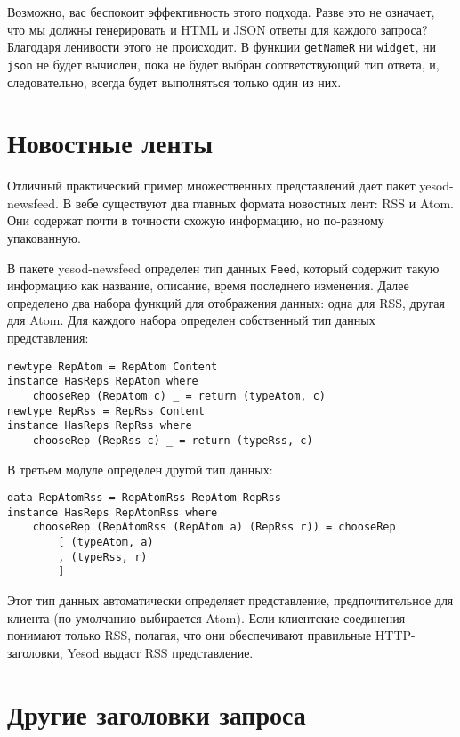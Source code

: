 Возможно, вас беспокоит эффективность этого подхода. Разве это не означает, что мы должны
генерировать и HTML и JSON ответы для каждого запроса? Благодаря ленивости этого не
происходит. В функции \lstinline'getNameR' ни \lstinline'widget', ни \lstinline'json' не
будет вычислен, пока не будет выбран соответствующий тип ответа, и, следовательно, всегда
будет выполняться только один из них.

\section{Новостные ленты}

Отличный практический пример множественных представлений дает пакет yesod-newsfeed. В вебе существуют два главных формата новостных лент: RSS и Atom. Они содержат почти в точности схожую информацию, но по-разному упакованную.

В пакете yesod-newsfeed определен тип данных \lstinline'Feed', который содержит такую информацию как название, описание, время последнего изменения. Далее определено два набора функций для отображения данных: одна для RSS, другая для Atom. Для каждого набора определен собственный тип данных представления:

\begin{lstlisting}
newtype RepAtom = RepAtom Content
instance HasReps RepAtom where
    chooseRep (RepAtom c) _ = return (typeAtom, c)
newtype RepRss = RepRss Content
instance HasReps RepRss where
    chooseRep (RepRss c) _ = return (typeRss, c)
\end{lstlisting}

В третьем модуле определен другой тип данных:

\begin{lstlisting}
data RepAtomRss = RepAtomRss RepAtom RepRss
instance HasReps RepAtomRss where
    chooseRep (RepAtomRss (RepAtom a) (RepRss r)) = chooseRep
        [ (typeAtom, a)
        , (typeRss, r)
        ]
\end{lstlisting}

Этот тип данных автоматически определяет представление, предпочтительное для клиента (по умолчанию выбирается Atom). Если клиентские соединения понимают только RSS, полагая, что они обеспечивают правильные HTTP-заголовки, Yesod выдаст RSS представление.

\section{Другие заголовки запроса}

